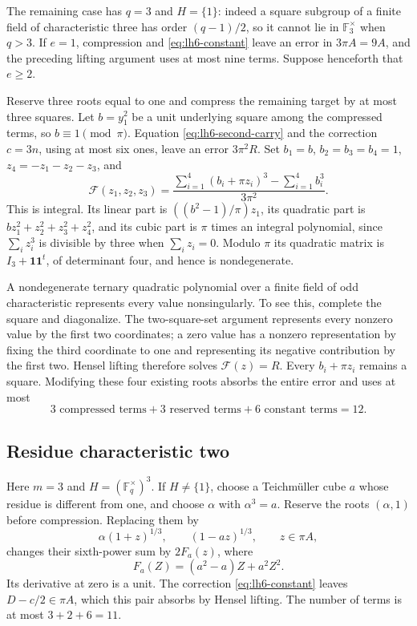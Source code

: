 \documentclass[11pt,reqno]{amsart}
\numberwithin{equation}{section}
\theoremstyle{definition}
\begin{document}
The remaining case has $q=3$ and $H=\{1\}$: indeed a square subgroup
of a finite field of characteristic three has order $(q-1)/2$, so it
cannot lie in $\mathbb F_3^\times$ when $q>3$.
If $e=1$, compression and \eqref{eq:lh6-constant} leave an error
in $3\pi A=9A$, and the preceding lifting argument uses at most nine
terms. Suppose henceforth that $e\ge2$.

Reserve three roots equal to one and compress the remaining target
by at most three squares. Let $b=y_1^2$ be a unit underlying square
among the compressed terms, so $b\equiv1\pmod\pi$. Equation
\eqref{eq:lh6-second-carry} and the correction $c=3n$, using at most
six ones, leave an error $3\pi^2R$.
Set $b_1=b$, $b_2=b_3=b_4=1$, $z_4=-z_1-z_2-z_3$, and
\[
 \mathcal F(z_1,z_2,z_3)
  =\frac{\sum_{i=1}^4(b_i+\pi z_i)^3-\sum_{i=1}^4b_i^3}
          {3\pi^2}.
\]
This is integral. Its linear part is $((b^2-1)/\pi)z_1$,
its quadratic part is $bz_1^2+z_2^2+z_3^2+z_4^2$, and its
cubic part is $\pi$ times an integral polynomial, since
$\sum_i z_i^3$ is divisible by three when $\sum_i z_i=0$.
Modulo $\pi$ its quadratic matrix is $I_3+\mathbf1\mathbf1^t$,
of determinant four, and hence is nondegenerate.

A nondegenerate ternary quadratic polynomial over a finite field of
odd characteristic represents every value nonsingularly. To see this,
complete the square and diagonalize. The two-square-set argument
represents every nonzero value by the first two coordinates; a zero
value has a nonzero representation by fixing the third coordinate to
one and representing its negative contribution by the first two.
Hensel lifting therefore solves $\mathcal F(z)=R$. Every
$b_i+\pi z_i$ remains a square. Modifying these four existing roots
absorbs the entire error and uses at most
\[
 3\text{ compressed terms}+3\text{ reserved terms}
       +6\text{ constant terms}=12.
\]

\subsection{Residue characteristic two}

Here $m=3$ and $H=(\mathbb F_q^\times)^3$.
If $H\ne\{1\}$, choose a Teichm\"uller cube $a$ whose residue is
different from one, and choose $\alpha$ with $\alpha^3=a$.
Reserve the roots $(\alpha,1)$ before compression. Replacing them by
\[
 \alpha(1+z)^{1/3},\qquad(1-az)^{1/3},\qquad z\in\pi A,
\]
changes their sixth-power sum by $2F_a(z)$, where
\begin{equation}\label{eq:lh6-dyadic-pair}
 F_a(Z)=(a^2-a)Z+a^2Z^2.
\end{equation}
Its derivative at zero is a unit. The correction
\eqref{eq:lh6-constant} leaves $D-c/2\in\pi A$, which this pair
absorbs by Hensel lifting. The number of terms is at most
$3+2+6=11$.
\end{document}
